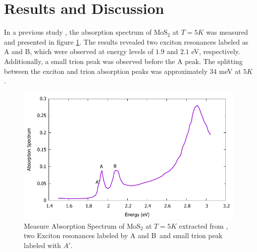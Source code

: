 \documentclass[12pt,english,a4paper]{article}
\begin{document}

\newpage
\section{Results and Discussion}
\quad In a previous study \cite{ang_absorption_2014}, the absorption spectrum of $\mathrm{MoS}_2$ at $T = 5K$ was measured and presented in figure \ref{Absorpt Ex.}. The results revealed two exciton resonances labeled as A and B, which were observed at energy levels of $1.9$ and $2.1$ eV, respectively. Additionally, a small trion peak was observed before the A peak. The splitting between the exciton and trion absorption peaks was approximately $34$ meV at $5K$.\\
\begin{figure}
	\begin{center}
		\includegraphics[width=0.5\linewidth]{images/experiment.pdf}
		\caption[Measured absorption spectrum of $\mathrm{MoS}_2$]{Measure Absorption Spectrum of $\mathrm{MoS}_2$ at $T=5K$  extracted from \cite{zhang_absorption_2014}, two Exciton resonances labeled by A and B\, and small trion peak labeled with $A'$.}
		\label{Absorpt Ex.}
	\end{center}
\end{figure}\null
\end{document}
